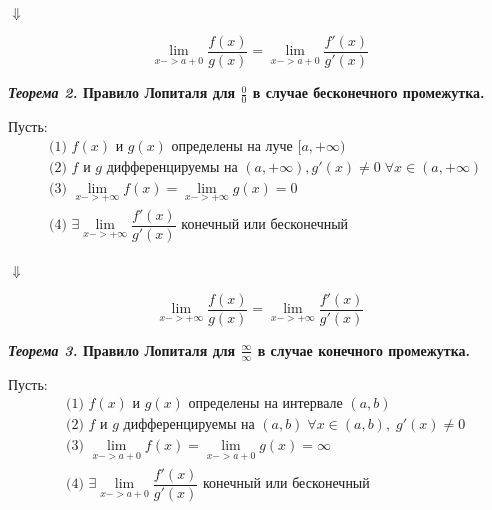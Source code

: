 \documentclass[a4paper,12pt]{article}
\theoremstyle{plain} %
\theoremstyle{definition} %
\theoremstyle{remark} %
\begin{document}
\begin{center}
	$\Downarrow$
\end{center}

\[\lim_{x-> a + 0} \dfrac{f(x)}{g(x)} =\lim_{x-> a + 0} \dfrac{f'(x)}{g'(x)} \]



\textbf{\textit{Теорема 2.} Правило Лопиталя для $\frac{0}{0}$ в случае бесконечного промежутка.}

Пусть:
\begin{equation*}
	\begin{aligned}
		 & \text{(1) } f(x) \text{ и } g(x) \text{ определены на луче }[a, +\infty)                                        \\
		 & \text{(2) } f \text{ и } g \text{ дифференцируемы на } (a, +\infty), g'(x) \neq 0 \; \forall x \in (a, +\infty) \\
		 & \text{(3) }  \lim_{x-> +\infty} f(x) =  \lim_{x-> +\infty} g(x) = 0                                             \\
		 & \text{(4) }  \exists \lim_{x-> +\infty} \dfrac{f'(x)}{g'(x)} \text{ конечный или бесконечный }                  \\
	\end{aligned}
\end{equation*}

\begin{center}
	$\Downarrow$
\end{center}

\[\lim_{x-> +\infty} \dfrac{f(x)}{g(x)} =\lim_{x->+\infty } \dfrac{f'(x)}{g'(x)} \]

\textbf{\textit{Теорема 3.} Правило Лопиталя для $\frac{\infty}{\infty}$ в случае конечного промежутка.}

Пусть:
\begin{equation*}
	\begin{aligned}
		 & \text{(1) } f(x) \text{ и } g(x) \text{ определены на интервале }(a, b)                                 \\
		 & \text{(2) } f \text{ и } g \text{ дифференцируемы на } (a, b)  \; \forall x \in (a, b), \; g'(x) \neq 0 \\
		 & \text{(3) }  \lim_{x-> a + 0} f(x) =  \lim_{x-> a + 0} g(x) = \infty                                    \\
		 & \text{(4) }  \exists \lim_{x-> a + 0 } \dfrac{f'(x)}{g'(x)} \text{ конечный или бесконечный }           \\
	\end{aligned}
\end{equation*}
\end{document}
